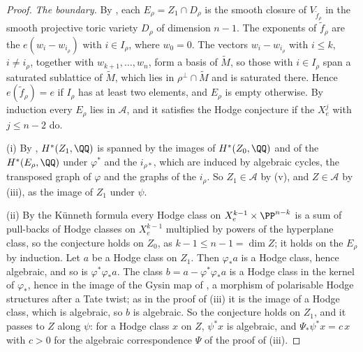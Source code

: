 \begin{proof}
\emph{The boundary.} By , each $E_{\rho}=Z_{1}\cap
D_{\rho}$ is the smooth closure of $V_{\widetilde f_{\rho}}$ in the smooth
projective toric variety $D_{\rho}$ of dimension $n-1$. The exponents of
$\widetilde f_{\rho}$ are the $e(w_{i}-w_{i_{\rho}})$ with $i\in I_{\rho}$,
where $w_{0}=0$. The vectors $w_{i}-w_{i_{\rho}}$ with $i\le k$,
$i\ne i_{\rho}$, together with $w_{k+1},\dots,w_{n}$, form a basis of
$\widetilde M$, so those with $i\in I_{\rho}$ span a saturated sublattice of
$\widetilde M$, which lies in $\rho^{\perp}\cap\widetilde M$ and is
saturated there. Hence $e(\widetilde f_{\rho})=e$ if $I_{\rho}$ has at least
two elements, and $E_{\rho}$ is empty otherwise. By induction every
$E_{\rho}$ lies in $\mathcal{A}$, and it satisfies the Hodge conjecture if
the $X^{j}_{e}$ with $j\le n-2$ do.

(i) By , $H^{*}(Z_{1},\QQ)$ is spanned by the images of
$H^{*}(Z_{0},\QQ)$ and of the $H^{*}(E_{\rho},\QQ)$ under $\varphi^{*}$ and
the $i_{\rho*}$, which are induced by algebraic cycles, the transposed
graph of $\varphi$ and the graphs of the $i_{\rho}$. So
$Z_{1}\in\mathcal{A}$ by (v), and $Z\in\mathcal{A}$ by
(iii), as the image of $Z_{1}$ under $\psi$.

(ii) By the K\"unneth formula every Hodge class on $X^{k-1}_{e}\times
\PP^{n-k}$ is a sum of pull-backs of Hodge classes on $X^{k-1}_{e}$
multiplied by powers of the hyperplane class, so the conjecture holds on
$Z_{0}$, as $k-1\le n-1=\dim Z$; it holds on the $E_{\rho}$ by induction.
Let $a$ be a Hodge class on $Z_{1}$. Then $\varphi_{*}a$ is a Hodge class,
hence algebraic, and so is $\varphi^{*}\varphi_{*}a$. The class
$b=a-\varphi^{*}\varphi_{*}a$ is a Hodge class in the kernel of
$\varphi_{*}$, hence in the image of the Gysin map of
, a morphism of polarisable Hodge structures after a
Tate twist; as in the proof of (iii) it is the image of a
Hodge class, which is algebraic, so $b$ is algebraic. So the conjecture
holds on $Z_{1}$, and it passes to $Z$ along $\psi$: for a Hodge class $x$
on $Z$, $\psi^{*}x$ is algebraic, and $\Psi_{*}\psi^{*}x=c\,x$ with $c>0$ for
the algebraic correspondence $\Psi$ of the proof of
(iii).
\end{proof}

